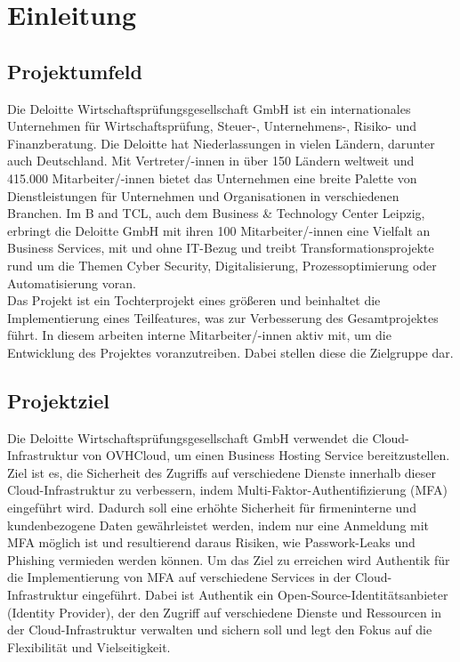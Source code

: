 
\section{Einleitung}
\label{sec:Einleitung}


\subsection{Projektumfeld} 
\label{sec:Projektumfeld}
Die Deloitte Wirtschaftsprüfungsgesellschaft GmbH ist ein internationales 
Unternehmen für Wirtschaftsprüfung, Steuer-, Unternehmens-, Risiko- und Finanzberatung.
Die Deloitte hat Niederlassungen in vielen Ländern, darunter auch Deutschland. 
Mit Vertreter/-innen in über 150 Ländern weltweit und 415.000 Mitarbeiter/-innen bietet das Unternehmen eine breite Palette 
von Dienstleistungen für Unternehmen und Organisationen in verschiedenen Branchen.
Im \acs{B and TCL}, auch dem Business \& Technology Center Leipzig, erbringt die Deloitte
GmbH mit ihren 100 Mitarbeiter/-innen eine Vielfalt an Business Services, mit und ohne IT-Bezug und treibt
Transformationsprojekte rund um die Themen Cyber Security, Digitalisierung,
Prozessoptimierung oder Automatisierung voran.
\\Das Projekt ist ein Tochterprojekt eines größeren und beinhaltet die Implementierung eines Teilfeatures, was zur 
Verbesserung des Gesamtprojektes führt. In diesem arbeiten interne Mitarbeiter/-innen aktiv mit, um die Entwicklung des
Projektes voranzutreiben. Dabei stellen diese die Zielgruppe dar.


\subsection{Projektziel} 
\label{sec:Projektziel}
Die Deloitte Wirtschaftsprüfungsgesellschaft GmbH verwendet die Cloud-Infrastruktur von OVHCloud, um einen Business 
Hosting Service bereitzustellen. 
\\Ziel ist es, die Sicherheit des Zugriffs auf verschiedene Dienste innerhalb dieser Cloud-Infrastruktur zu verbessern, indem 
Multi-Faktor-Authentifizierung (\acs{MFA}) eingeführt wird. Dadurch soll eine erhöhte Sicherheit für firmeninterne und kundenbezogene 
Daten gewährleistet werden, indem nur eine Anmeldung mit \acs{MFA} möglich ist und resultierend daraus Risiken, wie Passwork-Leaks 
und Phishing vermieden werden können.
Um das Ziel zu erreichen wird Authentik für die Implementierung von \acs{MFA} auf verschiedene Services in der 
Cloud-Infrastruktur eingeführt. 
Dabei ist Authentik ein Open-Source-Identitätsanbieter (Identity Provider), der den Zugriff auf verschiedene Dienste und 
Ressourcen in der Cloud-Infrastruktur verwalten und sichern soll und legt den Fokus auf die Flexibilität und Vielseitigkeit. 


